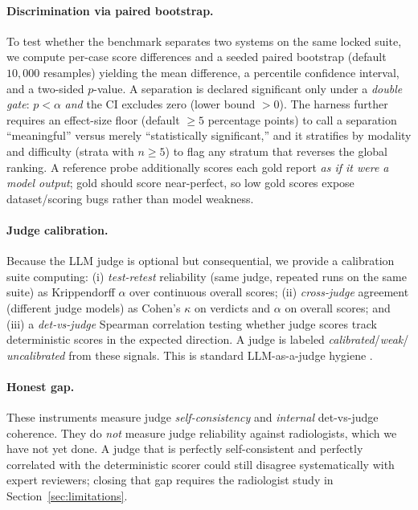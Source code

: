 \documentclass[11pt]{article}
\begin{document}
\paragraph{Discrimination via paired bootstrap.} To test whether the benchmark
separates two systems on the same locked suite, we compute per-case score
differences and a seeded paired bootstrap \cite{EfronTibshirani1993} (default
$10{,}000$ resamples) yielding the mean difference, a percentile confidence
interval, and a two-sided $p$-value. A separation is declared significant only
under a \emph{double gate}: $p<\alpha$ \emph{and} the CI excludes zero (lower
bound $>0$). The harness further requires an effect-size floor (default
$\ge5$ percentage points) to call a separation ``meaningful'' versus merely
``statistically significant,'' and it stratifies by modality and difficulty
(strata with $n\ge5$) to flag any stratum that reverses the global ranking. A
reference probe additionally scores each gold report \emph{as if it were a model
output}; gold should score near-perfect, so low gold scores expose
dataset/scoring bugs rather than model weakness.

\paragraph{Judge calibration.} Because the LLM judge is optional but
consequential, we provide a calibration suite computing: (i) \emph{test-retest}
reliability (same judge, repeated runs on the same suite) as Krippendorff
$\alpha$ over continuous overall scores; (ii) \emph{cross-judge} agreement
(different judge models) as Cohen's $\kappa$ on verdicts and $\alpha$ on overall
scores; and (iii) a \emph{det-vs-judge} Spearman correlation
\cite{Spearman1904} testing whether judge scores track deterministic scores in
the expected direction. A judge is labeled \emph{calibrated}/\emph{weak}/
\emph{uncalibrated} from these signals. This is standard LLM-as-a-judge hygiene
\cite{Zheng2023JudgeMTBench}.

\paragraph{Honest gap.} These instruments measure judge \emph{self-consistency}
and \emph{internal} det-vs-judge coherence. They do \emph{not} measure judge
reliability against radiologists, which we have not yet done. A judge that is
perfectly self-consistent and perfectly correlated with the deterministic scorer
could still disagree systematically with expert reviewers; closing that gap
requires the radiologist study in Section~\ref{sec:limitations}.
\end{document}
